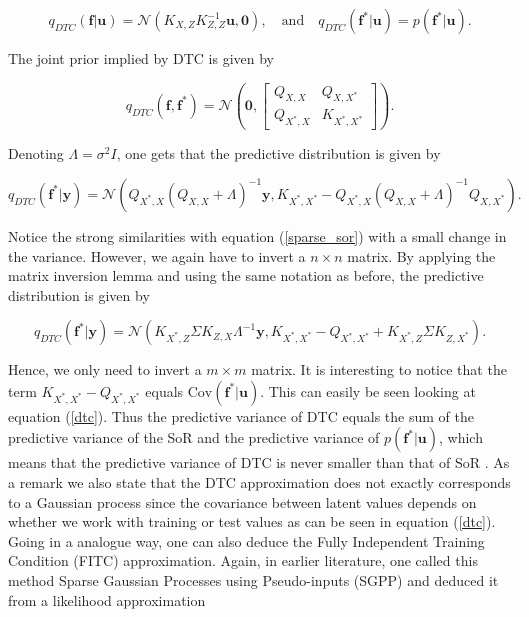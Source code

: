 \documentclass[12pt,a4paper,oneside]{book}
\begin{document}
\begin{equation} \label{dtc}
q_{DTC}(\bm{f}|\bm{u}) = \mathcal{N}(K_{X,Z} K^{-1}_{Z,Z} \bm{u} , \bm{0}), \quad \text{and} \quad q_{DTC}(\bm{f}^{\ast} | \bm{u}) = p (\bm{f}^{\ast}| \bm{u}). 
\end{equation}

The joint prior implied by DTC is given by

\begin{equation}
q_{DTC}(\bm{f},\bm{f}^{\ast}) = 
\mathcal{N} \left( \bm{0}, 
\begin{bmatrix}
    Q_{X,X} & Q_{X,X^{\ast}}\\
    Q_{X^{\ast},X}  & K_{X^{\ast},X^{\ast}}
\end{bmatrix} 
\right).
\end{equation}

Denoting $\Lambda = \sigma^2 I$, one gets that the predictive distribution is given by

\begin{equation}\label{sparse2}
q_{DTC} (\bm{f}^{\ast} | \bm{y} ) = \mathcal{N}(Q_{X^{\ast},X}(Q_{X,X} + \Lambda)^{-1}\bm{y}, K_{X^{\ast} ,X^{\ast}} - Q_{X^{\ast},X}(Q_{X,X} + \Lambda)^{-1} Q_{X,X^{\ast}}).
\end{equation}

Notice the strong similarities with equation (\ref{sparse_sor}) with a small change in the variance. However, we again have to invert a $n \times n$ matrix. By applying the matrix inversion lemma and using the same notation as before, the predictive distribution is given by

\begin{equation}\label{pred_DTC}
\boxed{
q_{DTC} (\bm{f}^{\ast} | \bm{y} ) = \mathcal{N}( K_{X^{\ast},Z} \Sigma K_{Z,X} \Lambda^{-1} \bm{y},   K_{X^{\ast},X^{\ast}} - Q_{X^{\ast},X^{\ast}} + K_{X^{\ast},Z} \Sigma K_{Z,X^{\ast}} ).}
\end{equation}

Hence, we only need to invert a $m \times m$ matrix. It is interesting to notice that the term $K_{X^{\ast},X^{\ast}} - Q_{X^{\ast},X^{\ast}}$ equals $\text{Cov}(\bm{f}^{\ast}|\bm{u})$. This can easily be seen looking at equation (\ref{dtc}). Thus the predictive variance of DTC equals the sum of the predictive variance of the SoR and the predictive variance of $p(\bm{f}^{\ast}|\bm{u})$, which means that the predictive variance of DTC is never smaller than that of SoR . As a remark we also state that the DTC approximation does not exactly corresponds to a Gaussian process since the covariance between latent values depends on whether we work with training or test values as can be seen in equation (\ref{dtc}).
Going in a analogue way, one can also deduce the Fully Independent Training Condition (FITC) approximation. Again, in earlier literature, one called this method Sparse Gaussian Processes using Pseudo-inputs (SGPP) and deduced it from a likelihood approximation 
\end{document}
